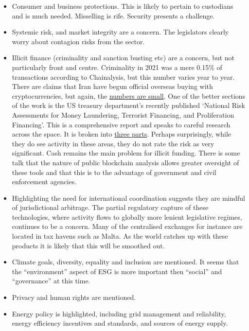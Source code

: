\begin{itemize}
\item Consumer and business protections. This is likely to pertain to custodians and is much needed. Misselling is rife. Security presents a challenge.  
\item Systemic risk, and market integrity are a concern. The legislators clearly worry about contagion risks from the sector.
\item Illicit finance (criminality and sanction busting etc) are a concern, but not particularly front and centre\cite{moser2013inquiry}. Criminality in 2021 was a mere 0.15\% of transactions according to Chainalysis, but this number varies year to year. There are claims that Iran have begun official overseas buying with cryptocurrencies, but again, the \href{https://finbold.com/iran-makes-the-first-ever-import-of-goods-using-cryptocurrency-worth-millions/}{numbers are small}. One of the better sections of the work is the US treasury department's recently published `National Risk Assessments for Money Laundering, Terrorist Financing, and Proliferation Financing'. This is a comprehensive report and speaks to careful research across the space. It is broken into \href{https://home.treasury.gov/news/press-releases/jy0619}{three parts}. Perhaps surprisingly, while they do see activity in these areas, they do not rate the risk as very significant. Cash remains the main problem for illicit funding. There is some talk that the nature of public blockchain analysis allows greater oversight of these tools and that this is to the advantage of government and civil enforcement agencies.
\item Highlighting the need for international coordination suggests they are mindful of jurisdictional arbitrage. 
The partial regulatory capture of these technologies, where activity flows to globally more lenient legislative regimes, continues to be a concern. Many of the centralised exchanges for instance are located in tax havens such as Malta. As the world catches up with these products it is likely that this will be smoothed out.
\item Climate goals, diversity, equality and inclusion are mentioned. It seems that the ``environment'' aspect of ESG is more important then ``social'' and ``governance'' at this time.
\item Privacy and human rights are mentioned.
\item Energy policy is highlighted, including grid management and reliability, energy efficiency incentives and standards, and sources of energy supply.
\end{itemize}
